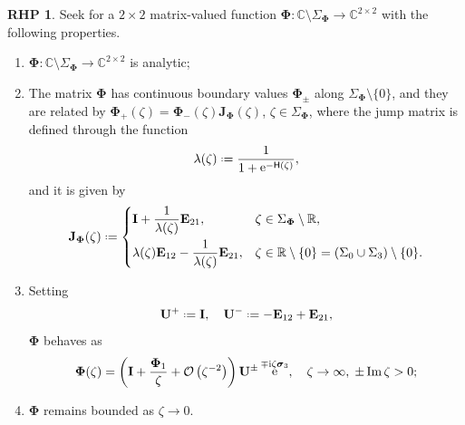 \documentclass[reqno,a4paper,11pt]{amsart}
\DeclareMathOperator{\im}{Im}
\DeclareMathOperator{\ee}{\rm e}
\newcommand{\C}{\mathbb{C}}
\newcommand{\R}{\mathbb{R}}
\newcommand{\Boh}{\mathcal{O}}
\newcommand{\ii}{\mathrm{i}}
\newcommand*{\deff}{\mathrel{\vcenter{\baselineskip0.5ex \lineskiplimit0pt
                     \hbox{\scriptsize.}\hbox{\scriptsize.}}}%
                     =}
\renewcommand{\bm}{\mathbf}
\newcommand{\msf}{\mathsf}
\renewcommand{\sp}{\boldsymbol \sigma}
\theoremstyle{definition}
\newtheorem{rhp}[theorem]{RHP}
\theoremstyle{remark}
\numberwithin{equation}{section}
\newcommand*{\defeq}{\mathrel{\vcenter{\baselineskip0.5ex \lineskiplimit0pt
                     \hbox{\scriptsize.}\hbox{\scriptsize.}}}%
                     =}
\begin{document}
\begin{rhp}
\label{rhp:Phi}
Seek for a $2\times 2$ matrix-valued function $\bm \Phi:\C\setminus \Sigma_{\bm \Phi}\to \C^{2\times 2}$ with the following properties.
\begin{enumerate}[\rm (i)]
\item $\bm \Phi:\C\setminus \Sigma_{\bm \Phi}\to \C^{2\times 2}$ is analytic;
\item The matrix $\bm \Phi$ has continuous boundary values $\bm \Phi_\pm$ along $\Sigma_{\bm \Phi}\setminus \{0\}$, and they are related by $\bm \Phi_+(\zeta)=\bm \Phi_-(\zeta)\bm J_{\bm \Phi}(\zeta)$, $\zeta\in \Sigma_{\bm \Phi}$, where the jump matrix is defined through the function
%
\begin{equation}\label{deff:lambdamodelprobl}
\lambda(\zeta) \defeq \frac{1}{1 + \ee^{- \msf H(\zeta)}},
\end{equation}
%
and it is given by
%
$$
\bm J_{\bm \Phi}(\zeta)\deff 
\begin{dcases}
    \bm I+\frac{1}{\lambda(\zeta)}\bm E_{21},\quad &\zeta \in \Sigma_{\bm \Phi}\setminus \R, \\ 
    \lambda(\zeta)\bm E_{12}-\frac{1}{\lambda(\zeta)}\bm E_{21}, & \zeta\in \R\setminus \{0\}=(\Sigma_0\cup\Sigma_3)\setminus \{0\}.
\end{dcases}
$$
%
\item Setting
%
\begin{equation}\label{eq:deffU}
    \bm U^+\deff \bm I,\quad 
    \bm U^-\deff -\bm E_{12}+\bm E_{21},    
\end{equation}
%
$\bm \Phi$ behaves as
%
\begin{equation}\label{eq:rhpPhiasympt}
    \bm \Phi(\zeta)
        = \left(\bm I+ \frac{\bm \Phi_1}{\zeta} + \Boh \left(\zeta^{-2} \right)\right)\bm U^\pm \ee^{\mp \ii \zeta\sp_3}, \quad \zeta\to \infty, \; \pm \im \zeta>0;
\end{equation}

\item $\bm \Phi$ remains bounded as $\zeta\to 0$.
%
\end{enumerate}
\end{rhp}
\end{document}
